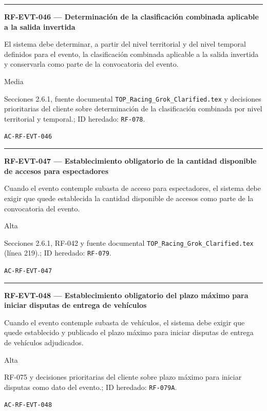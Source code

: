 \documentclass[10pt,letterpaper]{article}
\begin{document}
\vspace{0.25em}\hrule\vspace{0.65em}
\noindent\textbf{RF-EVT-046 --- Determinación de la clasificación combinada aplicable a la salida invertida}\par
\begin{description}[style=nextline,leftmargin=3.15cm,labelwidth=2.8cm,font=\normalfont\bfseries]
\item[Obligación] El sistema debe determinar, a partir del nivel territorial y del nivel temporal definidos para el evento, la clasificación combinada aplicable a la salida invertida y conservarla como parte de la convocatoria del evento.
\item[Prioridad] Media
\item[Procedencia] Secciones 2.6.1, fuente documental \texttt{TOP\_Racing\_Grok\_Clarified.tex} y decisiones prioritarias del cliente sobre determinación de la clasificación combinada por nivel territorial y temporal.; ID heredado: \texttt{RF-078}.
\item[Verificación] \texttt{AC-RF-EVT-046}
\end{description}
\vspace{0.25em}\hrule\vspace{0.65em}
\noindent\textbf{RF-EVT-047 --- Establecimiento obligatorio de la cantidad disponible de accesos para espectadores}\par
\begin{description}[style=nextline,leftmargin=3.15cm,labelwidth=2.8cm,font=\normalfont\bfseries]
\item[Obligación] Cuando el evento contemple subasta de acceso para espectadores, el sistema debe exigir que quede establecida la cantidad disponible de accesos como parte de la convocatoria del evento.
\item[Prioridad] Alta
\item[Procedencia] Secciones 2.6.1, RF-042 y fuente documental \texttt{TOP\_Racing\_Grok\_Clarified.tex} (línea 219).; ID heredado: \texttt{RF-079}.
\item[Verificación] \texttt{AC-RF-EVT-047}
\end{description}
\vspace{0.25em}\hrule\vspace{0.65em}
\noindent\textbf{RF-EVT-048 --- Establecimiento obligatorio del plazo máximo para iniciar disputas de entrega de vehículos}\par
\begin{description}[style=nextline,leftmargin=3.15cm,labelwidth=2.8cm,font=\normalfont\bfseries]
\item[Obligación] Cuando el evento contemple subasta de vehículos, el sistema debe exigir que quede establecido y publicado el plazo máximo para iniciar disputas de entrega de vehículos adjudicados.
\item[Prioridad] Alta
\item[Procedencia] RF-075 y decisiones prioritarias del cliente sobre plazo máximo para iniciar disputas como dato del evento.; ID heredado: \texttt{RF-079A}.
\item[Verificación] \texttt{AC-RF-EVT-048}
\end{description}
\end{document}
